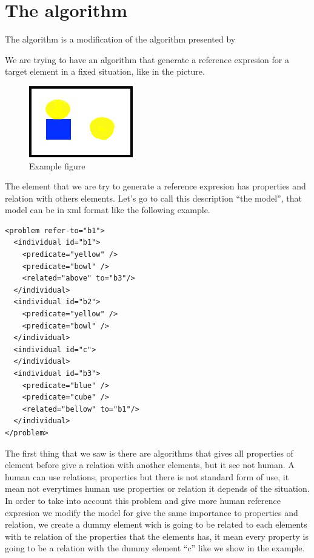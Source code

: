 \section{The algorithm}
\label{sec:algorithm}



The algorithm is a modification of the algorithm presented by \cite{arec2:2008:Areces}

We are trying to have an algorithm that generate a reference expresion for a target element in a fixed situation, like in the picture. 
\begin{figure}[htb]
\centering
\includegraphics[angle=0,width=0.3\linewidth]{yellowBallBlueCube}
\caption{ 
\label{figura1}
Example figure
}
\end{figure}
The element that we are try to generate a reference expresion has properties and relation with others elements. Let's go to call this description ``the model'', that model can be in xml format like the following example.
\begin{verbatim}
<problem refer-to="b1">
  <individual id="b1">
    <predicate="yellow" />
    <predicate="bowl" />
    <related="above" to="b3"/>
  </individual>
  <individual id="b2">
    <predicate="yellow" />
    <predicate="bowl" />
  </individual>
  <individual id="c">
  </individual>
  <individual id="b3">
    <predicate="blue" />
    <predicate="cube" />
    <related="bellow" to="b1"/>
  </individual>
</problem>
\end{verbatim}
The first thing that we saw is there are algorithms that gives all properties of element before give a relation with another elements, but it see not human. A human can use relations, properties but there is not standard form of use, it mean not everytimes human use properties or relation it depends of the situation. In order to take into account this problem and give more human reference expresion we modify the model for give the same importance to properties and relation, we create a dummy element wich is going to be related to each elements with te relation of the properties that the elements has, it mean every property is going to be a relation with the dummy element ``c'' like we show in the example.

